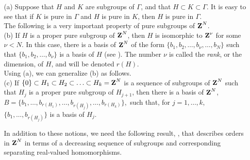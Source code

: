 \begin{rem1}
{\rm 
 (a) Suppose that $H$ and $K$
are subgroups of $\Gamma$, and that
$H\subset K\subset \Gamma$.  It is easy to see that if $K$ 
 is pure in $\Gamma$ and $H$ is pure 
 in $K$, then $H$ is pure in $\Gamma$.  \\
The following is a very important property of 
pure subgroups of $\Z^N$.\\
(b) If $H$ is a proper pure subgroup of $\Z^N$,  
then $H$ is isomorphic to $\Z^\nu$ for some $\nu <N$.  
In this case, there is a basis of $\Z^N$ of the form 
 $\{b_1,b_2,\ldots,b_\nu,\ldots,b_N\}$ such that 
  $\{b_1,b_2,\ldots,b_\nu\}$  is a basis of $H$ 
(see \cite[Theorem A. 26]{hr1}).
The number $\nu$ is called the {\em rank},
or the {\rm dimension}, of $H$, and will be denoted
$r(H)$.  
\\
Using (a), we can generalize (b) as follows.\\
(c)  If 
  $\{0\}\subset H_1
  \subset H_2\subset\ldots \subset H_k=\Z^N$ 
  is a sequence of subgroups of $\Z^N$ 
  such that $H_j$ is a proper pure subgroup of 
  $H_{j+1}$, then there is a basis of $\Z^N$, $B=\{b_1,\ldots,b_{r(H_1)},\ldots,b_{r(H_j)},\dots,b_{r(H_k)}\}$,\ 
  such that, for $j=1,\ldots,k$,
  $\{b_1,\ldots,b_{r(H_j)}\}$ 
  is a basis of $H_j$.\\
}
\label{rem1}
\end{rem1}
In addition to these notions, we need 
the following result, \cite[Theorem (2.5)]{asm1}, that describes
orders in $\Z^N$ in terms of a 
decreasing sequence of subgroups
and corresponding separating real-valued homomorphisms.

